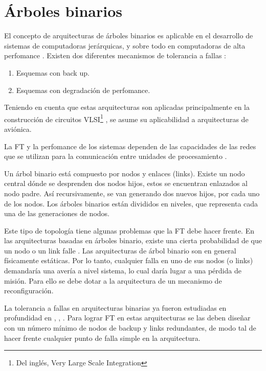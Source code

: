\begin{comment}
 Bibliografía utilizada aquí:
 
 \cite{Raghavendra84} -> Fault tolerance in Binary Tree Architecture
 
\end{comment}


\section{Árboles binarios}\label{sec:binary_tree}
El concepto de arquitecturas de árboles binarios es aplicable en el desarrollo de sistemas de 
computadoras jerárquicas, y sobre todo en computadoras de alta perfomance \citep{Raghavendra84}. 
Existen dos diferentes mecanismos de tolerancia a fallas \citep{Raghavendra84}:
\begin{enumerate}
 \item Esquemas con back up.
 \item Esquemas con degradación de perfomance.
\end{enumerate}

Teniendo en cuenta que estas arquitecturas son aplicadas principalmente en la construcción de 
circuitos VLSI\footnote{Del inglés, Very Large Scale Integration} \citep{Singh91}, se asume su 
aplicabilidad a arquitecturas de aviónica. 

La \ac{FT} y la perfomance de los sistemas dependen de las capacidades de las redes que se utilizan 
para la comunicación entre unidades de procesamiento \citep{Raghavendra84}. 

Un árbol binario está compuesto por nodos y enlaces (links). Existe un nodo central dónde se 
desprenden dos nodos hijos, estos se encuentran enlazados al nodo padre. Así recursivamente, se 
van generando dos nuevos hijos, por cada uno de los nodos. Los árboles binarios están divididos en 
niveles, que representa cada una de las generaciones de nodos.

Este tipo de topología tiene algunas problemas que la \ac{FT} debe hacer frente. En las 
arquitecturas basadas en árboles binario, existe una cierta probabilidad de que un nodo o un link 
falle \citep{Raghavendra84}. Las arquitecturas de árbol binario son en general físicamente 
estáticas. Por lo tanto, cualquier falla en uno de sus nodos (o links) demandaría una avería a 
nivel sistema, lo cual daría lugar a una pérdida de misión. Para ello se debe dotar a la 
arquitectura de un mecanismo de reconfiguración.

La tolerancia a fallas en arquitecturas binarias ya fueron estudiadas en profundidad en 
\cite{Hayes76}, \cite{Raghavendra84}, \cite{Singh91}. Para lograr \ac{FT} en estas arquitecturas se 
las deben diseñar con un número mínimo de nodos de backup y links redundantes, de modo tal de hacer 
frente cualquier punto de falla simple en la arquitectura. 

